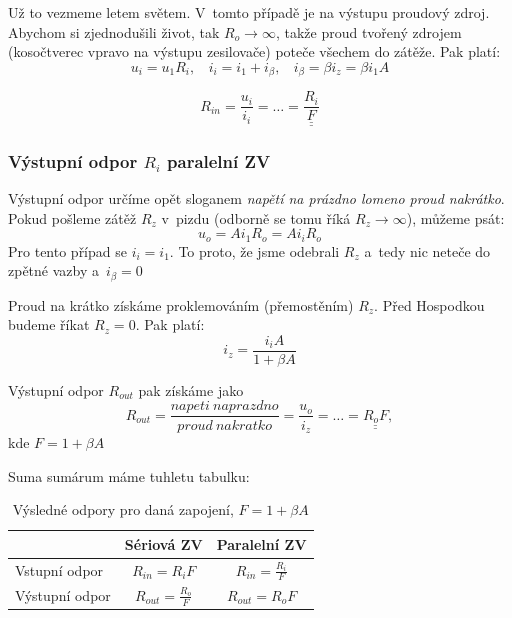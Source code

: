 \documentclass[a4paper,12pt]{article}   %
\begin{document}
Už to vezmeme letem světem. V~tomto případě je na výstupu proudový zdroj. Abychom si zjednodušili život, tak $R_o \rightarrow \infty$, takže proud tvořený zdrojem (kosočtverec vpravo na výstupu zesilovače) poteče všechem do zátěže. Pak platí: 
\begin{equation}
    u_i = u_\text{1} R_i,~~~~i_i=i_\text{1} + i_\beta,~~~~ i_\beta = \beta i_z = \beta i_1 A
\end{equation}

\begin{equation}
    R_{in} = \frac{u_i}{i_i} = \dots = \underline{\underline{\frac{R_i}{F}}}
\end{equation}

\subsubsection*{Výstupní odpor $R_i$ paralelní ZV}
Výstupní odpor určíme opět sloganem \textit{napětí na prázdno lomeno proud nakrátko}.
Pokud pošleme zátěž $R_z$ v~pizdu (odborně se tomu říká $R_z \rightarrow \infty$), můžeme psát:
\begin{equation*}
    u_o = Ai_\text{1}R_o = Ai_iR_o
\end{equation*}
Pro tento případ se $i_i = i_\text{1}$. To proto, že jsme odebrali $R_z$ a~tedy nic neteče do zpětné vazby a~$i_\beta = 0$

Proud na krátko získáme proklemováním (přemostěním) $R_z$. Před Hospodkou budeme říkat $R_z = 0$. Pak platí:
\begin{equation*}
    i_z = \frac{i_i A}{1+\beta A}
\end{equation*}

Výstupní odpor $R_{out}$ pak získáme jako
\begin{equation}
    R_{out} = \frac{napeti~naprazdno}{proud~nakratko} = \frac{u_o}{i_z} = \dots = \underline{\underline{R_o F}},
\end{equation}
kde $F=1+\beta A$

Suma sumárum máme tuhletu tabulku:
\begin{table}[h!]
    \centering
    \begin{tabular}{|l|c|c|}
        \hline
        & Sériová ZV & Paralelní ZV\\\hline\hline
        \rule{0pt}{2.5ex}Vstupní odpor & $R_{in} = R_i F$ & $R_{in} = \frac{R_i}{F}$\\[.7ex]\hline
        \rule{0pt}{2.5ex}Výstupní odpor & $R_{out} = \frac{R_o}{F}$ & $R_{out} = R_o F$\\[.7ex]\hline
    \end{tabular}        
    \caption{Výsledné odpory pro daná zapojení, $F=1+\beta A$}
    \label{tab:zv:odpory}
\end{table}%
\end{document}

